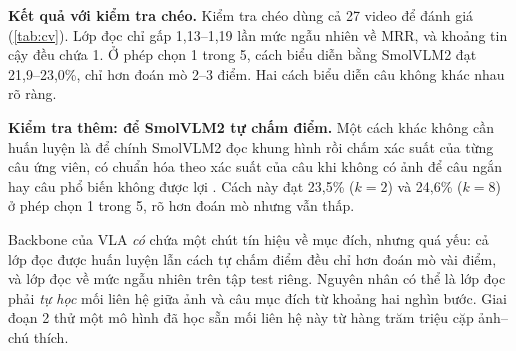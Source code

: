 \documentclass[a4paper,oneside]{report}
\begin{document}
\textbf{Kết quả với kiểm tra chéo.} Kiểm tra chéo dùng cả 27 video để đánh giá (\cref{tab:cv}). Lớp đọc chỉ gấp 1,13--1,19 lần mức ngẫu nhiên về MRR, và khoảng tin cậy đều chứa 1. Ở phép chọn 1 trong 5, cách biểu diễn bằng SmolVLM2 đạt 21,9--23,0\%, chỉ hơn đoán mò 2--3 điểm. Hai cách biểu diễn câu không khác nhau rõ ràng.

\begin{table}[ht]
\centering
\caption{Giai đoạn 1: lớp đọc trên đặc trưng SmolVLM2, kiểm tra chéo 8 nhóm theo khung cảnh, 2.503 bước. Mức ngẫu nhiên: MRR 0,0298; chọn 1 trong 5 là 20\%.}
\label{tab:cv}
\small
{}
\end{table}

\textbf{Kiểm tra thêm: để SmolVLM2 tự chấm điểm.} Một cách khác không cần huấn luyện là để chính SmolVLM2 đọc khung hình rồi chấm xác suất của từng câu ứng viên, có chuẩn hóa theo xác suất của câu khi không có ảnh để câu ngắn hay câu phổ biến không được lợi \citep{holtzman2021surface}. Cách này đạt 23,5\% ($k=2$) và 24,6\% ($k=8$) ở phép chọn 1 trong 5, rõ hơn đoán mò nhưng vẫn thấp.

\begin{ketqua}
Backbone của VLA \textit{có} chứa một chút tín hiệu về mục đích, nhưng quá yếu: cả lớp đọc được huấn luyện lẫn cách tự chấm điểm đều chỉ hơn đoán mò vài điểm, và lớp đọc về mức ngẫu nhiên trên tập test riêng. Nguyên nhân có thể là lớp đọc phải \textit{tự học} mối liên hệ giữa ảnh và câu mục đích từ khoảng hai nghìn bước. Giai đoạn 2 thử một mô hình đã học sẵn mối liên hệ này từ hàng trăm triệu cặp ảnh--chú thích.
\end{ketqua}
\end{document}

